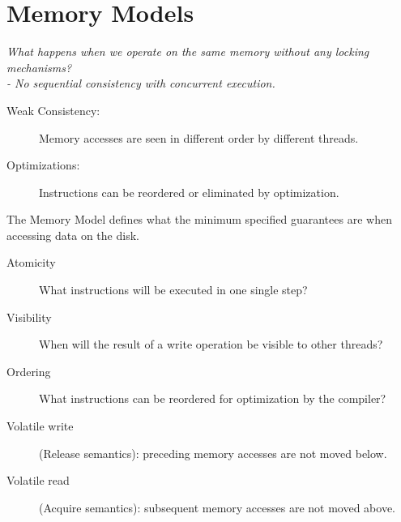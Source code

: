 \section{Memory Models}

\textit{What happens when we operate on the same memory without any locking mechanisms? \\- No sequential consistency with concurrent execution.}

\begin{description}
  \item[Weak Consistency:] Memory accesses are seen in different order by different threads.
  \item[Optimizations:] Instructions can be reordered or eliminated by optimization.  
\end{description}

\noindent
The Memory Model defines what the minimum specified guarantees are when accessing data on the disk.

\begin{description}
  \item[Atomicity] What instructions will be executed in one single step?
  \item[Visibility] When will the result of a write operation be visible to other threads? 
  \item[Ordering] What instructions can be reordered for optimization by the compiler?  
\end{description}

\begin{description}
  \item[Volatile write] (Release semantics): preceding memory accesses are not moved below.
  \item[Volatile read] (Acquire semantics): subsequent memory accesses are not moved above.  
\end{description}

